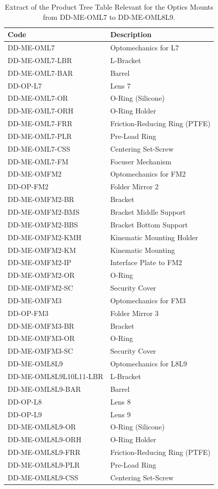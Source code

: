 \documentclass{report}
\begin{document}
\begin{table}
\caption{Extract of the Product Tree Table Relevant for the Optics Mounts from DD-ME-OML7 to DD-ME-OML8L9.}
\label{table:WOB-product-tree2}
\begin{center}
\small
\begin{tabular}{ll}
\hline
\hline
Code                &Description\\
\hline
DD-ME-OML7	&	Optomechanics for L7	\\
DD-ME-OML7-LBR	&	L-Bracket	\\
DD-ME-OML7-BAR	&	Barrel	\\
DD-OP-L7	&	Lens 7	\\
DD-ME-OML7-OR	&	O-Ring (Silicone)	\\
DD-ME-OML7-ORH	&	O-Ring Holder	\\
DD-ME-OML7-FRR	&	Friction-Reducing Ring (PTFE)	\\
DD-ME-OML7-PLR	&	Pre-Load Ring	\\
DD-ME-OML7-CSS	&	Centering Set-Screw	\\
DD-ME-OML7-FM	&	Focuser Mechanism	\\
\hline
DD-ME-OMFM2	&	Optomechanics for FM2	\\
DD-OP-FM2	&	Folder Mirror 2	\\
DD-ME-OMFM2-BR 	&	Bracket	\\
DD-ME-OMFM2-BMS	&	Bracket Middle Support	\\
DD-ME-OMFM2-BBS 	&	Bracket Bottom Support	\\
DD-ME-OMFM2-KMH 	&	Kinematic Mounting Holder	\\
DD-ME-OMFM2-KM 	&	Kinematic Mounting	\\
DD-ME-OMFM2-IP 	&	Interface Plate to FM2	\\
DD-ME-OMFM2-OR 	&	O-Ring	\\
DD-ME-OMFM2-SC	&	Security Cover	\\
\hline
DD-ME-OMFM3	&	Optomechanics for FM3	\\
DD-OP-FM3	&	Folder Mirror 3	\\
DD-ME-OMFM3-BR 	&	Bracket	\\
DD-ME-OMFM3-OR 	&	O-Ring	\\
DD-ME-OMFM3-SC 	&	Security Cover	\\
\hline
DD-ME-OML8L9	&	Optomechanics for L8L9	\\
DD-ME-OML8L9L10L11-LBR	&	L-Bracket	\\
DD-ME-OML8L9-BAR	&	Barrel	\\
DD-OP-L8	&	Lens 8	\\
DD-OP-L9	&	Lens 9	\\
DD-ME-OML8L9-OR	&	O-Ring (Silicone)	\\
DD-ME-OML8L9-ORH	&	O-Ring Holder	\\
DD-ME-OML8L9-FRR	&	Friction-Reducing Ring (PTFE)	\\
DD-ME-OML8L9-PLR	&	Pre-Load Ring	\\
DD-ME-OML8L9-CSS	&	Centering Set-Screw	\\
\hline
\end{tabular}
\end{center}
\end{table}
\end{document}
